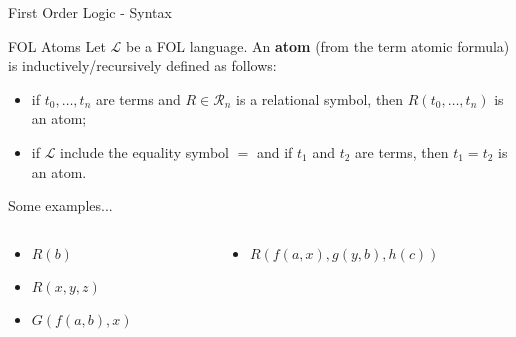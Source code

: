 \documentclass[aspectratio=169]{beamer}
\begin{document}
\begin{slide}{First Order Logic - Syntax}
  \begin{block}{FOL Atoms}  
  Let $\mathcal{L}$ be a FOL language. An {\bf atom} (from the term atomic formula) is inductively/recursively defined as follows:
  \begin{itemize}
  \item if $t_0,\ldots,t_n$ are terms and $R \in \mathcal{R}_n$ is a relational symbol, then $R(t_0,\ldots,t_n)$ is an atom;
  \item if $\mathcal{L}$ include the equality symbol $=$ and if $t_1$ and $t_2$ are terms, then $t_1 = t_2$ is an atom.  
  \end{itemize}
  \end{block}
  
  \begin{block}{Some examples...}
  \begin{columns}
    \begin{column}{0.48\textwidth}
      \begin{itemize}
        \item $R(b)$
        \item $R(x,y,z)$
        \item $G(f(a,b),x)$
      \end{itemize}
    \end{column}
    \begin{column}{0.48\textwidth}
      \begin{itemize}
        \item $R(f(a,x),g(y,b),h(c))$
      \end{itemize}        
    \end{column}
  \end{columns}
  \end{block}

\end{slide}
\end{document}
